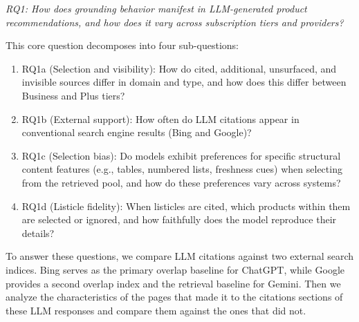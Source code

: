 \textit{RQ1: How does grounding behavior manifest in LLM-generated product recommendations, and how does it vary across subscription tiers and providers?}

This core question decomposes into four sub-questions:

\begin{enumerate}
    \item RQ1a (Selection and visibility): How do cited, additional, unsurfaced, and invisible sources differ in domain and type, and how does this differ between Business and Plus tiers?
    \item RQ1b (External support): How often do LLM citations appear in conventional search engine results (Bing and Google)?
    \item RQ1c (Selection bias): Do models exhibit preferences for specific structural content features (e.g., tables, numbered lists, freshness cues) when selecting from the retrieved pool, and how do these preferences vary across systems?
    \item RQ1d (Listicle fidelity): When listicles are cited, which products within them are selected or ignored, and how faithfully does the model reproduce their details?
\end{enumerate}

To answer these questions, we compare LLM citations against two external search indices. Bing serves as the primary overlap baseline for ChatGPT, while Google provides a second overlap index and the retrieval baseline for Gemini. Then we analyze the characteristics of the pages that made it to the citations sections of these LLM responses and compare them against the ones that did not.
